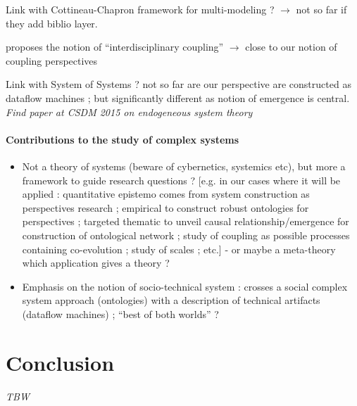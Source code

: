 Link with Cottineau-Chapron framework for multi-modeling ? $\rightarrow$ not so far if they add biblio layer.

\cite{reymond2013logique} proposes the notion of ``interdisciplinary coupling'' $\rightarrow$ close to our notion of coupling perspectives

Link with System of Systems ? not so far are our perspective are constructed as dataflow machines ; but significantly different as notion of emergence is central. \textit{Find paper at CSDM 2015 on endogeneous system theory}


\paragraph{Contributions to the study of complex systems}

\begin{itemize}
\item Not a theory of systems (beware of cybernetics, systemics etc), but more a framework to guide research questions ? [e.g. in our cases where it will be applied : quantitative epistemo comes from system construction as perspectives research ; empirical to construct robust ontologies for perspectives ; targeted thematic to unveil causal relationship/emergence for construction of ontological network ; study of coupling as possible processes containing co-evolution ; study of scales ; etc.] - or maybe a meta-theory which application gives a theory ?
\item Emphasis on the notion of socio-technical system : crosses a social complex system approach (ontologies) with a description of technical artifacts (dataflow machines) ; ``best of both worlds'' ? 
\end{itemize}






\section*{Conclusion}

\textit{TBW}









